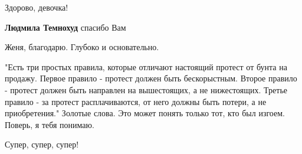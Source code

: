 \begin{itemize}
\begin{itemize}
\end{itemize}

 
Здорово, девочка!

\begin{itemize}
 
\textbf{Людмила Темнохуд} спасибо Вам
\end{itemize}

 
Женя, благодарю. Глубоко и основательно.

 

"Есть три простых правила, которые отличают настоящий протест от бунта на
продажу. Первое правило - протест должен быть бескорыстным. Второе правило -
протест должен быть направлен на вышестоящих, а не нижестоящих. Третье правило
- за протест расплачиваются, от него должны быть потери, а не приобретения."
Золотые слова. Это может понять только тот, кто был изгоем. Поверь, я тебя
понимаю.


 
Супер, супер, супер!

\end{itemize}

